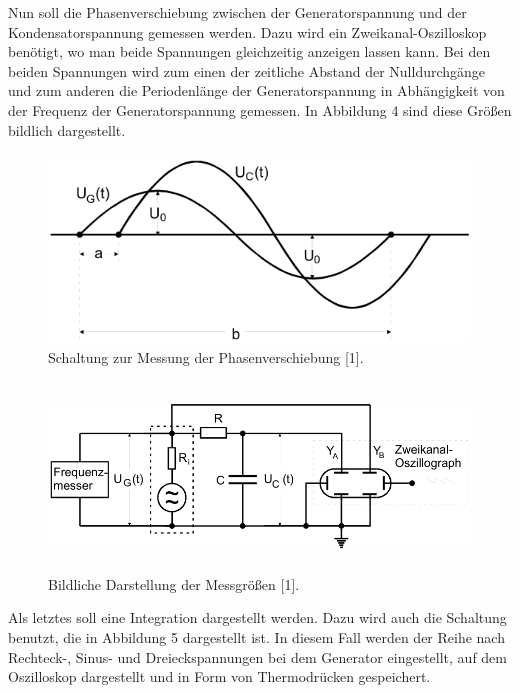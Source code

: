 Nun soll die Phasenverschiebung zwischen der Generatorspannung und der Kondensatorspannung
gemessen werden. Dazu wird ein Zweikanal-Oszilloskop benötigt, wo man beide Spannungen
gleichzeitig anzeigen lassen kann. Bei den beiden Spannungen wird zum einen der
zeitliche Abstand der Nulldurchgänge und zum anderen die Periodenlänge der Generatorspannung
in Abhängigkeit von der Frequenz der Generatorspannung gemessen.
In Abbildung 4 sind diese Größen bildlich dargestellt.

\begin{figure}[H]
  \centering
  \includegraphics[height=5cm, width=\textwidth]{D4.png}
  \caption{Schaltung zur Messung der Phasenverschiebung [1].}
\end{figure}

\begin{figure}[H]
  \centering
  \includegraphics[height=5cm, width=\textwidth]{D3.png}
  \caption{Bildliche Darstellung der Messgrößen [1].}
\end{figure}

Als letztes soll eine Integration dargestellt werden. Dazu wird auch die Schaltung
benutzt, die in Abbildung 5 dargestellt ist. In diesem Fall werden der Reihe nach
Rechteck-, Sinus- und Dreieckspannungen bei dem Generator eingestellt, auf
dem Oszilloskop dargestellt und in Form von Thermodrücken gespeichert.
